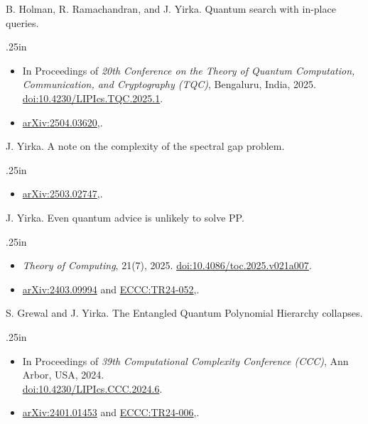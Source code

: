 \documentclass[11pt,letterpaper,serif]{moderncv}
\begin{document}
B. Holman, R. Ramachandran, and J. Yirka.\quad
Quantum search with in-place queries.
\begin{adjustwidth}{.25in}{}
	\begin{itemize}
		\item In Proceedings of \textit{20th Conference on the Theory of Quantum Computation, Communication, and Cryptography (TQC)}, Bengaluru, India,  2025.\quad
		\href{https://doi.org/10.4230/LIPIcs.TQC.2025.1}{doi:10.4230/LIPIcs.TQC.2025.1}.
		\item[--] \href{https://arxiv.org/abs/2504.03620}{arXiv:2504.03620},.
	\end{itemize}
\end{adjustwidth}
\medskip

J. Yirka.\quad
A note on the complexity of the spectral gap problem.
\begin{adjustwidth}{.25in}{}
	\begin{itemize}
		\item[--] \href{https://arxiv.org/abs/2503.02747}{arXiv:2503.02747},.
	\end{itemize}
\end{adjustwidth}
\medskip

J. Yirka.\quad
Even quantum advice is unlikely to solve \textup{PP}.
\begin{adjustwidth}{.25in}{}
	\begin{itemize}
		\item[--] \textit{Theory of Computing}, 21(7), 2025.\quad
		\href{http://doi.org/10.4086/toc.2025.v021a007}{doi:10.4086/toc.2025.v021a007}.
		\item[--] \href{https://arxiv.org/abs/2403.09994}{arXiv:2403.09994} and \href{https://eccc.weizmann.ac.il/report/2024/052/}{ECCC:TR24-052},.
	\end{itemize}
\end{adjustwidth}
\medskip

S. Grewal and J. Yirka.\quad
The Entangled Quantum Polynomial Hierarchy collapses.
\begin{adjustwidth}{.25in}{}
	\begin{itemize}
		\item In Proceedings of \textit{39th Computational Complexity Conference (CCC)}, Ann Arbor, USA, 2024.\quad
		\\
		\href{https://doi.org/10.4230/LIPIcs.CCC.2024.6}{doi:10.4230/LIPIcs.CCC.2024.6}.
		\item[--] \href{https://arxiv.org/abs/2401.01453}{arXiv:2401.01453} and \href{https://eccc.weizmann.ac.il/report/2024/006/}{ECCC:TR24-006},.
	\end{itemize}
\end{adjustwidth}
\medskip
\end{document}

